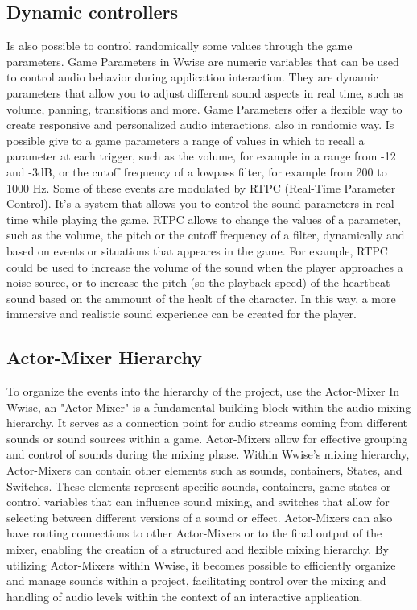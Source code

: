 	\subsection{Dynamic controllers}
	Is also possible to control randomically some values through the game parameters.
	Game Parameters in Wwise are numeric variables that can be used to control audio behavior during application interaction. They are dynamic parameters that allow you to adjust different sound aspects in real time, such as volume, panning, transitions and more. Game Parameters offer a flexible way to create responsive and personalized audio interactions, also in randomic way. Is possible give to a game parameters a range of values ​​in which to recall a parameter at each trigger, such as the volume, for example in a range from -12 and -3dB, or the cutoff frequency of a lowpass filter, for example from 200 to 1000 Hz.
	Some of these events are modulated by RTPC (Real-Time Parameter Control). It's a system that allows you to control the sound parameters in real time while playing the game.
	RTPC allows to change the values ​​of a parameter, such as the volume, the pitch or the cutoff frequency of a filter, dynamically and based on events or situations that appeares in the game. For example, RTPC could be used to increase the volume of the sound when the player approaches a noise source, or to increase the pitch (so the playback speed) of the heartbeat sound based on the ammount of the healt of the character. In this way, a more immersive and realistic sound experience can be created for the player.
	
	\subsection{Actor-Mixer Hierarchy}
	To organize the events into the hierarchy of the project, use the Actor-Mixer
	In Wwise, an "Actor-Mixer" is a fundamental building block within the audio mixing hierarchy. It serves as a connection point for audio streams coming from different sounds or sound sources within a game. Actor-Mixers allow for effective grouping and control of sounds during the mixing phase.
	Within Wwise's mixing hierarchy, Actor-Mixers can contain other elements such as sounds, containers, States, and Switches. These elements represent specific sounds, containers, game states or control variables that can influence sound mixing, and switches that allow for selecting between different versions of a sound or effect.
	Actor-Mixers can also have routing connections to other Actor-Mixers or to the final output of the mixer, enabling the creation of a structured and flexible mixing hierarchy.
	By utilizing Actor-Mixers within Wwise, it becomes possible to efficiently organize and manage sounds within a project, facilitating control over the mixing and handling of audio levels within the context of an interactive application.
	
